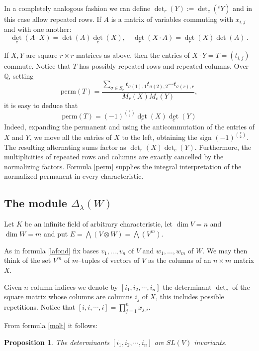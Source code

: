 \documentclass[10pt]{amsart}
\newtheorem{proposition}[theorem]{Proposition}
\theoremstyle{definition}
\theoremstyle{remark}
\newcommand{\perm}{\textrm{perm}}
\newcommand{\Q}{\mathbb Q}
\begin{document}
In a completely analogous fashion we can define $\det_r(Y):=\det_c(^tY)$ and in this case allow  repeated rows.
If $A$  is  a     matrix of variables commuting with $x_{i,j}$  and with one another:
\begin{equation}\label{molt}
{\det}_c(A\cdot X)=\det(A) {\det}_c(X),\quad  {\det}_r(X\cdot A)= {\det}_r(X)\det(A)\,.
\end{equation} 



If $X,Y$ are  square $r\times r$ matrices as above, then   the entries of  $X\cdot Y=T=(t_{i,j})$   commute.  Notice that $T$  has possibly repeated rows and repeated columns. 
Over $\Q$, setting \[\perm(T)=\frac{\sum_{\sigma\in S_r} t_ {\sigma(1),1} t_ {\sigma(2),2}\cdots t_{\sigma(r),r}}{M_r(X)M_c(Y)},\]
it is easy to deduce that 
\begin{equation}\label{perm}
\perm(T)=(-1)^{\binom{r}{2} }  {\det}_r(X) {\det}_c(Y)
\end{equation} 
Indeed,
expanding the permanent and using the anticommutation
of the entries of $X$ and $Y$, we move all the entries
of $X$ to the left, obtaining the sign
$(-1)^{\binom r2}$. The resulting alternating sums
factor as $\det_r(X)\det_c(Y)$. Furthermore, the multiplicities
of repeated rows and columns are exactly cancelled
by the normalizing factors. Formula \eqref{perm} supplies the integral interpretation of the normalized permanent in every characteristic.

\subsection{The module $\Delta_\lambda (W)$ }
Let $K$ be an infinite field of arbitrary characteristic, let $\dim V=n$ and
$\dim W=m$ and put $E=\bigwedge(V\otimes W)=\bigwedge(V^m)$.  \smallskip

As in  formula \eqref{lafond} fix bases $v_1,\ldots,v_n$ of $V$ and $w_1,\ldots,w_m$ of $W$.  We may then think of the set $V^m$ of $m$--tuples of vectors of $V$ as the columns of an $n\times m$ matrix $X$.

Given $n$ column indices  we denote by $[i_1,i_2,\cdots,i_n]$  the determinant $\det_c$  of the square matrix whose columns are columns $i_j$ of $X$, this includes possible repetitions. Notice that $[i ,i ,\cdots,i ]=\prod_{j=1}^nx_{j,i}.$\smallskip

From formula \eqref{molt} it follows:
\begin{proposition}\label{detinv}
The determinants  $[i_1,i_2,\cdots,i_n]$ are $S L(V)$ invariants.
\end{proposition} 
\end{document}
